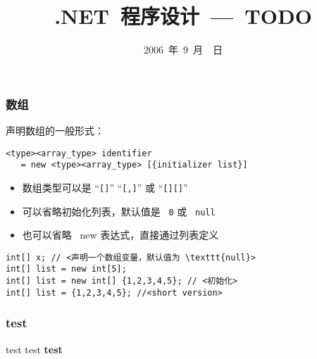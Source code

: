 





\title{.NET~程序设计~---~TODO}
\date{2006~年~9~月~~日}



\begin{frame}[fragile]
\frametitle{数组}
声明数组的一般形式：
\begin{lstlisting}
<type><array_type> identifier
   = new <type><array_type> [{initializer list}]
\end{lstlisting}
\begin{itemize}
\item 数组类型可以是 ``\texttt{[]}'' ``\texttt{[,]}'' 或 ``\texttt{[][]}''
\item 可以省略初始化列表，默认值是 ~{\redwarn\texttt{0}} 或 ~{\redwarn\texttt{null}}
\item 也可以省略 ~new 表达式，直接通过列表定义
\end{itemize}
\pause
\begin{lstlisting}[escapeinside=<>]
int[] x; // <声明一个数组变量，默认值为 \texttt{null}>
int[] list = new int[5];
int[] list = new int[] {1,2,3,4,5}; // <初始化>
int[] list = {1,2,3,4,5}; //<short version>
\end{lstlisting}
\end{frame}

\begin{frame}
\frametitle{test}
test {\ttfamily test} {\bfseries test}
\end{frame}


% 
% 
% 
% 




